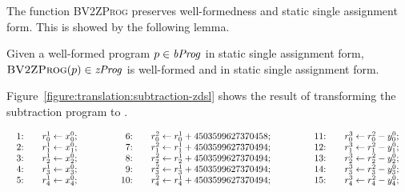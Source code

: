The function \textsc{BV2ZProg} preserves well-formedness and static single assignment form. This is showed by the following lemma.

\begin{lemma}
  \label{lemma:bv2z-prog}
  Given a well-formed program $p \in \mathit{bProg}$ in static single assignment form, $\textsc{BV2ZProg}(p) \in \mathit{zProg}$ is well-formed and in static single assignment form.
\end{lemma}

Figure~\ref{figure:translation:subtraction-zdsl} shows the result of transforming the subtraction program  to \zdsl.

\begin{figure*}
  \centering
  \[
  \begin{array}{lclcl}
    \begin{array}{rcl}
    \textmd{1:} && {r}^1_0 \leftarrow {x}^0_0; \\
    \textmd{2:} && {r}^1_1 \leftarrow {x}^0_1; \\
    \textmd{3:} && {r}^1_2 \leftarrow {x}^0_2; \\
    \textmd{4:} && {r}^1_3 \leftarrow {x}^0_3; \\
    \textmd{5:} && {r}^1_4 \leftarrow {x}^0_4; \\
    \end{array}
    &\hspace{.05\textwidth}&
    \begin{array}{rcl}
    \textmd{6:} &&
      {r}^2_0 \leftarrow {r}^1_0 + {4503599627370458}; \\
    \textmd{7:} &&
      {r}^2_1 \leftarrow {r}^1_1 + {4503599627370494}; \\
    \textmd{8:} &&
      {r}^2_2 \leftarrow {r}^1_2 + {4503599627370494}; \\
    \textmd{9:} &&
      {r}^2_3 \leftarrow {r}^1_3 + {4503599627370494}; \\
    \textmd{10:} &&
      {r}^2_4 \leftarrow {r}^1_4 + {4503599627370494};\\
    \end{array}
    &\hspace{.05\textwidth}&
    \begin{array}{rcl}
    \textmd{11:} && {r}^3_0 \leftarrow {r}^2_0 - {y}^0_0; \\
    \textmd{12:} && {r}^3_1 \leftarrow {r}^2_1 - {y}^0_1; \\
    \textmd{13:} && {r}^3_2 \leftarrow {r}^2_2 - {y}^0_2; \\
    \textmd{14:} && {r}^3_3 \leftarrow {r}^2_3 - {y}^0_3; \\
    \textmd{15:} && {r}^3_4 \leftarrow {r}^2_4 - {y}^0_4;
    \end{array}
  \end{array}
  \]
  \caption{Subtraction \textsc{BV2ZProg}()}
  \label{figure:translation:subtraction-zdsl}
\end{figure*}


